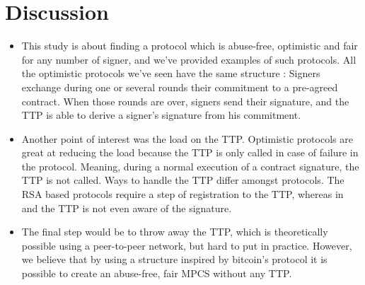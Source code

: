\section{Discussion}

\begin{itemize}
\item{} This study is about finding a protocol which is abuse-free, optimistic and fair for any number of signer, and we've provided examples of such protocols. All the optimistic protocols we've seen have the same structure : Signers exchange during one or several rounds their commitment to a pre-agreed contract. When those rounds are over, signers send their signature, and the TTP is able to derive a signer's signature from his commitment.
\item{} Another point of interest was the load on the TTP. Optimistic protocols are great at reducing the load because the TTP is only called in case of failure in the protocol. Meaning, during a normal execution of a contract signature, the TTP is not called. Ways to handle the TTP differ amongst protocols. The RSA based protocols \cite{wang-rsa}\cite{Chen} require a step of registration to the TTP, whereas in \cite{Original} and \cite{DAG-MPCS} the TTP is not even aware of the signature.
\item{} The final step would be to throw away the TTP, which is theoretically possible using a peer-to-peer network, but hard to put in practice. However, we believe that by using a structure inspired by bitcoin's protocol it is possible to create an abuse-free, fair MPCS without any TTP.
\end{itemize}
